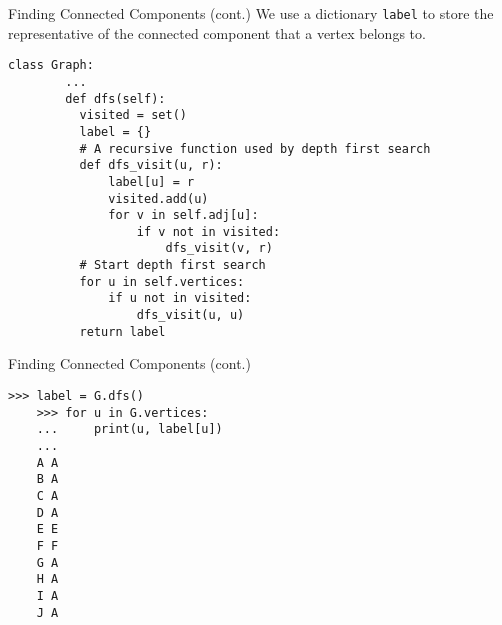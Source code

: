 \documentclass{beamer}
\begin{document}
\begin{frame}[fragile]{Finding Connected Components (cont.)}
  We use a dictionary \lstinline{label} to store the representative of the
  connected component that a vertex belongs to.
  \begin{block}{}
    \scriptsize
    \begin{lstlisting}[gobble=4]
    class Graph:
        ...
        def dfs(self):
          visited = set()
          label = {}
          # A recursive function used by depth first search
          def dfs_visit(u, r):
              label[u] = r
              visited.add(u)
              for v in self.adj[u]:
                  if v not in visited:
                      dfs_visit(v, r)
          # Start depth first search
          for u in self.vertices:
              if u not in visited:
                  dfs_visit(u, u)
          return label
    \end{lstlisting}
  \end{block}
\end{frame}

\begin{frame}[fragile]{Finding Connected Components (cont.)}
  \begin{block}{}
    \tiny
    \begin{lstlisting}[gobble=4]
    >>> label = G.dfs()
    >>> for u in G.vertices:
    ...     print(u, label[u])
    ... 
    A A
    B A
    C A
    D A
    E E
    F F
    G A
    H A
    I A
    J A
    \end{lstlisting}
  \end{block}
  \begin{figure}
  \end{figure}
\end{frame}
\end{document}
